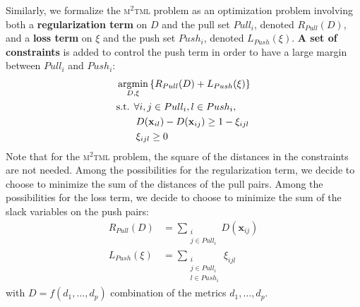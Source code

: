Similarly, we formalize the \textsc{m$^2$tml} problem as an optimization problem involving both a \textbf{regularization term} on $D$ and the pull set $Pull_i$, denoted $R_{Pull}(D)$, and a \textbf{loss term} on $\xi$ and the push set $Push_i$, denoted $L_{Push}(\xi)$. \textbf{A set of constraints} is added to control the push term in order to have a large margin between $Pull_i$ and $Push_i$:
\begin{equation}
\begin{aligned}
\displaystyle 	& \argmin_{D,\xi} \left\lbrace R_{Pull}(D) + L_{Push}(\xi) \right\rbrace  \\
& \text{s.t. } 	\forall i, j \in Pull_i, l \in Push_i, \\
				& \qquad D(\textbf{x}_{il})-D(\textbf{x}_{ij}) \geq 1 - \xi_{ijl} \\
				& \qquad \xi_{ijl} \geq 0 
\end{aligned}
\end{equation}
\noindent Note that for the \textsc{m$^2$tml} problem, the square of the distances in the constraints are not needed. Among the possibilities for the regularization term, we decide to choose to minimize the sum of the distances of the pull pairs. Among the possibilities for the loss term, we decide to choose to minimize the sum of the slack variables on the push pairs: 
\begin{align}
	R_{Pull}(D) 	& = \sum_{\substack{i \\ j \in Pull_i}}D(\textbf{x}_{ij}) \\
	L_{Push}(\xi) 	& = \sum\limits_{\substack{i \\ j \in Pull_i \\ l \in Push_i}} \xi_{ijl}
\end{align}
with $D = f(d_1, \ldots, d_p)$ combination of the metrics $d_1, \ldots, d_p$.

